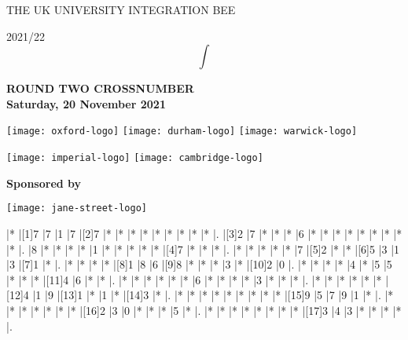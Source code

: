\documentclass[11pt, a4paper]{article}
\begin{document}
    

\thispagestyle{empty}

\begin{center}
    \Huge\textsc{THE UK UNIVERSITY INTEGRATION BEE}

    \Huge 2021/22
    $$
    \int
    $$
\end{center}

\vspace{0.8in}

\begin{center}
    \Huge\sffamily\textbf{ROUND TWO CROSSNUMBER}\\
    \LARGE\textbf{Saturday, 20 November 2021}
\end{center}

\vspace{0.7in}

\begin{center}
    \begin{adjustwidth}{2cm}{2cm}

\texttt{[image: oxford-logo]}
\hfill
\texttt{[image: durham-logo]}
\hfill
\texttt{[image: warwick-logo]}


\vspace{0.2in}

\texttt{[image: imperial-logo]}
\hfill
\texttt{[image: cambridge-logo]}

\end{adjustwidth}
\end{center}


\vspace{0.6in}

\begin{center}
    \Large
\textbf{Sponsored by}

\vspace{0.15in}

\texttt{[image: jane-street-logo]}
\end{center}
\clearpage
\begin{Puzzle}{15}{11}
|*    |[1]7 |7 |1  |7     |[2]7  |*     |*  |*    |*  |*     |*    |* |*  |*  |.
|[3]2    |7    |*    |*  |*     |6  |*     |*  |*    |*  |*     |* |*    |*  |*  |.
|8 |*    |*    |*  |*  |1  |*     |*  |*    |*  |*     |[4]7    |*    |*  |*  |.
|*    |*    |* |*  |*     |7  |[5]2     |*  |*    |[6]5  |3     |1    |3    |[7]1  |*  |.
|*    |*    |*    |* |[8]1     |8  |6     |[9]8  |*    |*  |*     |3   |*    |[10]2  |0  |.
|*    |*    |*    |*  |4     |*  |5     |5  |* |*  |*     |[11]4    |6    |*  |*  |.
|* |*    |*    |*  |*     |*  |6     |*  |*    |*  |*     |3    |*    |*  |*  |.
|*    |*    |*    |*  |* |*  |[12]4     |1  |9    |[13]1  |* |1    |*    |[14]3  |*  |.
|*    |*    |*    |*  |*     |*  |*     |*  |*    |[15]9  |5     |7    |9    |1  |*  |.
|*    |*    |*    |*  |*     |*  |* |[16]2  |3    |0  |*     |*    |*    |5  |*  |.
|*    |*    |*    |*  |*     |*  |*     |*  |[17]3    |4  |3     |*    |*    |*  |*  |.
\end{Puzzle}
\end{document}
